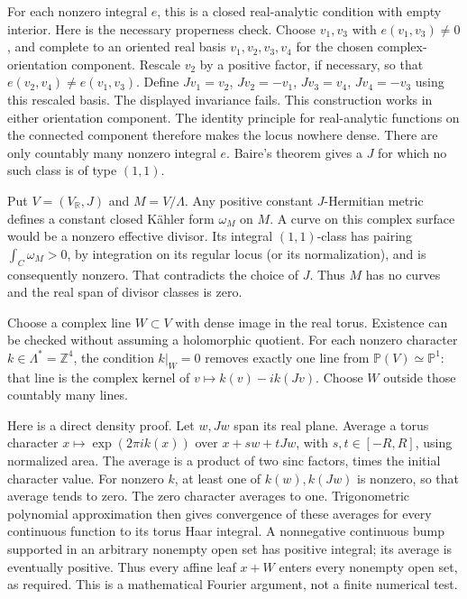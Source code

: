 \documentclass[11pt]{article}
\begin{document}
For each nonzero integral $e$, this is a closed real-\allowbreak{}analytic condition with empty interior. Here is the necessary properness check. Choose $v_1,v_3$ with $e(v_1,v_3)\ne0$, and complete to an oriented real basis $v_1,v_2,v_3,v_4$ for the chosen complex-\allowbreak{}orientation component. Rescale $v_2$ by a positive factor, if necessary, so that $e(v_2,v_4)\ne e(v_1,v_3)$. Define $Jv_1=v_2$, $Jv_2=-v_1$, $Jv_3=v_4$, $Jv_4=-v_3$ using this rescaled basis. The displayed invariance fails. This construction works in either orientation component. The identity principle for real-\allowbreak{}analytic functions on the connected component therefore makes the locus nowhere dense. There are only countably many nonzero integral $e$. Baire's theorem gives a $J$ for which no such class is of type $(1,1)$.

Put $V=(V_{\mathbb R},J)$ and $M=V/\Lambda$. Any positive constant $J$-\allowbreak{}Hermitian metric defines a constant closed Kähler form $\omega_M$ on $M$. A curve on this complex surface would be a nonzero effective divisor. Its integral $(1,1)$-\allowbreak{}class has pairing $\int_C\omega_M>0$, by integration on its regular locus (or its normalization), and is consequently nonzero. That contradicts the choice of $J$. Thus $M$ has no curves and the real span of divisor classes is zero.

Choose a complex line $W\subset V$ with dense image in the real torus. Existence can be checked without assuming a holomorphic quotient. For each nonzero character $k\in\Lambda^*=\mathbb Z^4$, the condition $k|_W=0$ removes exactly one line from $\mathbb P(V)\simeq\mathbb P^1$: that line is the complex kernel of $v\mapsto k(v)-i k(Jv)$. Choose $W$ outside those countably many lines.

Here is a direct density proof. Let $w,Jw$ span its real plane. Average a torus character $x\mapsto\exp(2\pi i k(x))$ over $x+sw+tJw$, with $s,t\in[-R,R]$, using normalized area. The average is a product of two sinc factors, times the initial character value. For nonzero $k$, at least one of $k(w),k(Jw)$ is nonzero, so that average tends to zero. The zero character averages to one. Trigonometric polynomial approximation then gives convergence of these averages for every continuous function to its torus Haar integral. A nonnegative continuous bump supported in an arbitrary nonempty open set has positive integral; its average is eventually positive. Thus every affine leaf $x+W$ enters every nonempty open set, as required. This is a mathematical Fourier argument, not a finite numerical test.
\end{document}
